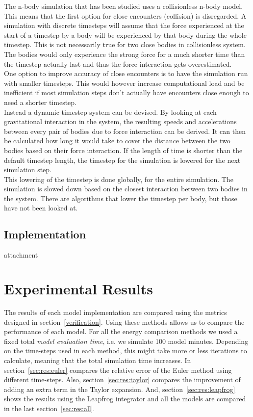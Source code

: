 \documentclass[11pt]{article} %
\begin{document}
The n-body simulation that has been studied uses a collisionless n-body model. This means that the first option for close encounters (collision) is disregarded. A simulation with discrete timesteps will assume that the force experienced at the start of a timestep by a body will be experienced by that body during the whole timestep. This is not necessarily true for two close bodies in collisionless system. The bodies would only experience the strong force for a much shorter time than the timestep actually last and thus the force interaction gets overestimated. \\
One option to improve accuracy of close encounters is to have the simulation run with smaller timesteps. This would however increase computational load and be inefficient if most simulation steps don't actually have encounters close enough to need a shorter timestep.\\
Instead a dynamic timestep system can be devised. By looking at each gravitational interaction in the system, the resulting speeds and accelerations between every pair of bodies due to force interaction can be derived. It can then be calculated how long it would take to cover the distance between the two bodies based on their force interaction. If the length of time is shorter than the default timestep length, the timestep for the simulation is lowered for the next simulation step.\\ 
This lowering of the timestep is done globally, for the entire simulation. The simulation is slowed down based on the closest interaction between two bodies in the system. There are algorithms that lower the timestep per body, but those have not been looked at.
\subsection{Implementation}
attachment
\section{Experimental Results}
\label{sec:results}
The results of each model implementation are compared using the metrics designed in section~\ref{verification}. Using these methods allows us to compare the performance of each model. For all the energy comparison methods we used a fixed total \textit{model evaluation time}, i.e. we simulate 100 model minutes. Depending on the time-steps used in each method, this might take more or less iterations to calculate, meaning that the total simulation time increases. In
section~\ref{sec:res:euler} compares the relative error of the Euler method using different time-steps. Also, section~\ref{sec:res:taylor} compares the improvement of adding an extra term in the Taylor expansion. And, section~\ref{sec:res:leapfrog} shows the results using the Leapfrog integrator and all the models are compared in the last section~\ref{sec:res:all}.
\end{document}
